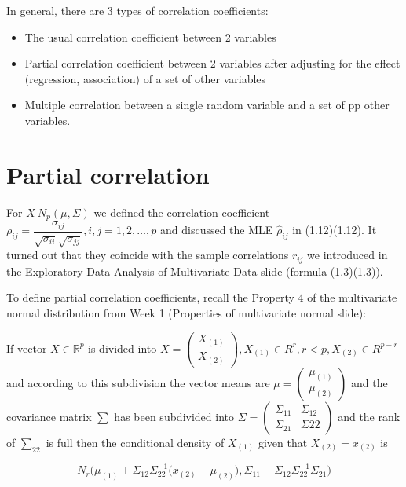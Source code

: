 \documentclass[11pt]{article}
\begin{document}
In general, there are 3 types of correlation coefficients:
\begin{itemize}
    \item The usual correlation coefficient between 2 variables
    \item Partial correlation coefficient between 2 variables after adjusting for the effect (regression, association) of a set of other variables
    \item Multiple correlation between a single random variable and a set of pp other variables.
\end{itemize}

\section{Partial correlation}\label{sec:partial-correlation}

For $X ~ N_p (\mu, \Sigma)$ we defined the correlation coefficient $\rho_{ij} = \dfrac{\sigma_{ij}}{\sqrt{\sigma_{ii}}\sqrt{\sigma_{jj}}}, i,j = 1, 2, \dots, p$
and discussed the MLE $\hat{\rho}_{ij}$ in (1.12)(1.12).
It turned out that they coincide with the sample correlations $r_{ij}$ we
introduced in the Exploratory Data Analysis of Multivariate Data slide (formula
(1.3)(1.3)).

To define partial correlation coefficients, recall the Property 4 of the
multivariate normal distribution from Week 1 (Properties of multivariate
normal slide):

If vector $X \in \mathbb{R}^p$ is divided into
$X = \begin{pmatrix} X_{(1)} \\ X_{(2)}\end{pmatrix}, X_{(1)} \in R^r , r < p, X_{(2)} \in R^{p-r}$
and according to this subdivision the vector means are $\mu = \begin{pmatrix} \mu_{(1)} \\ \mu_{(2)}\end{pmatrix}$
and the covariance matrix $\sum$ has been subdivided into $\Sigma = \begin{pmatrix} \Sigma_{11} & \Sigma_{12} \\ \Sigma_{21} & \Sigma{22}\end{pmatrix}$
and the rank of $\sum_{22}$ is full then the conditional density of $X_{(1)}$ given that $X_{(2)} = x_{(2)}$ is

\[
    N_r \bigg( \mu_{(1)} + \Sigma_{12} \Sigma_{22}^{-1} \bigg( x_{(2)} - \mu_{(2)} \bigg), \Sigma_{11} - \Sigma_{12} \Sigma_{22}^{-1} \Sigma_{21}\bigg)
\]
\end{document}
